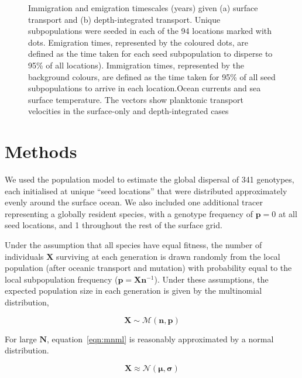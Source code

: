 \documentclass[12pt]{article}
\begin{document}
\begin{figure}[t!]
    \centering
    \caption{Immigration and emigration timescales (years) given (a) surface transport and (b) depth-integrated transport. Unique subpopulations were seeded in each of the 94 locations marked with dots. Emigration times, represented by the coloured dots, are defined as the time taken for each seed subpopulation to disperse to 95\% of all locations). Immigration times, represented by the background colours, are defined as the time taken for 95\% of all seed subpopulations to arrive in each location.Ocean currents and sea surface temperature. The vectors show planktonic transport velocities in the surface-only and depth-integrated cases}
\label{}
\end{figure}







\section{Methods}


We used the population model to estimate the global dispersal of 341 genotypes, each initialised at unique ``seed locations'' that were distributed approximately evenly around the surface ocean. We also included one additional tracer representing a globally resident species, with a genotype frequency of $\mathbf{p} = 0$ at all seed locations, and 1 throughout the rest of the surface grid.

Under the assumption that all species have equal fitness, the number of individuals $\mathbf{X}$ surviving at each generation is drawn randomly from the local population (after oceanic transport and mutation) with probability equal to the local subpopulation frequency ($\mathbf{p} = \mathbf{X} \mathbf{n}^{-1}$). Under these assumptions, the expected population size in each generation is given by the multinomial distribution, 

\begin{equation}
\label{eqn:mnml}
\mathbf{X}\sim\mathcal{M}(\mathbf{n},\mathbf{p})
\end{equation}

For large $\mathbf{N}$, equation~\ref{eqn:mnml} is reasonably approximated by a normal distribution.

\begin{equation}
\mathbf{X}\approx\mathcal{N}(\boldsymbol{\mu},\boldsymbol{\sigma})
\end{equation}
\end{document}
